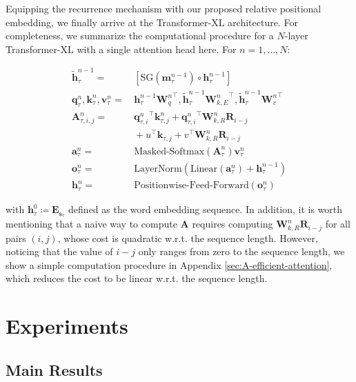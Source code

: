 \documentclass[11pt,a4paper]{article}
\def\rva{{\mathbf{a}}}
\def\rvh{{\mathbf{h}}}
\def\rvk{{\mathbf{k}}}
\def\rvm{{\mathbf{m}}}
\def\rvo{{\mathbf{o}}}
\def\rvq{{\mathbf{q}}}
\def\rvs{{\mathbf{s}}}
\def\rvv{{\mathbf{v}}}
\def\rmA{{\mathbf{A}}}
\def\rmE{{\mathbf{E}}}
\def\rmR{{\mathbf{R}}}
\def\rmW{{\mathbf{W}}}
\begin{document}
Equipping the recurrence mechanism with our proposed relative positional embedding, we finally arrive at the Transformer-XL architecture.
For completeness, we summarize the computational procedure for a $N$-layer Transformer-XL with a single attention head here. For $n = 1, \dots, N$:
\par\nobreak
\vspace{-0.5em}
\small
\begingroup
\allowdisplaybreaks
\begin{align*}
\widetilde{\rvh}_{\tau}^{n-1}
	=&\, \left[ \text{SG}(\rvm_{\tau}^{n-1}) \circ \rvh_{\tau}^{n-1} \right] \\
\rvq_{\tau}^{n}, \rvk_{\tau}^{n}, \rvv_{\tau}^{n}
	=&\, \rvh_{\tau}^{n-1} {\rmW_q^{n}}^\top, \widetilde{\rvh}_{\tau}^{n-1} {\rmW_{k,E}^{n}}^\top, \widetilde{\rvh}_{\tau}^{n-1} {\rmW_v^{n}}^\top \\
\rmA_{\tau,i,j}^{n}
	=&\, {\rvq_{\tau,i}^{n}}^\top \rvk_{\tau,j}^{n} + {\rvq_{\tau,i}^{n}}^\top \rmW_{k,R}^{n} \rmR_{i-j} \\&\,+ u^\top \rvk_{\tau,j} + v^\top \rmW_{k,R}^{n} \rmR_{i-j} \\
\rva_{\tau}^{n} =&\, \text{Masked-Softmax}(\rmA_{\tau}^{n}) \rvv_{\tau}^{n} \\
\rvo_{\tau}^{n} =&\, \text{LayerNorm}(\text{Linear}(\rva_{\tau}^{n}) + \rvh_{\tau}^{n-1}) \\
\rvh_{\tau}^{n} =&\, \text{Positionwise-Feed-Forward}(\rvo_{\tau}^{n})
\end{align*}
\endgroup
\normalsize
\vspace{-1.5em}

\noindent with $\rvh_{\tau}^{0} \coloneqq \rmE_{\rvs_{\tau}}$ defined as the word embedding sequence.
In addition, it is worth mentioning that a naive way to compute $\rmA$ requires computing $\rmW_{k,R}^{n} \rmR_{i-j}$ for all pairs $(i,j)$, whose cost is quadratic w.r.t. the sequence length.
However, noticing that the value of $i-j$ only ranges from zero to the sequence length,
we show a simple computation procedure in Appendix \ref{sec:A-efficient-attention}, which reduces the cost to be linear w.r.t. the sequence length.

 
\section{Experiments}
\label{sec:exp}

\subsection{Main Results}
\end{document}
